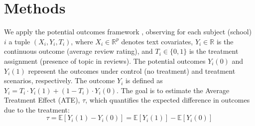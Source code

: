 \documentclass[11pt]{article}
\begin{document}
\section{Methods}
\label{sec:methods}
\label{subsec:estimation-treatment-effects}
We apply the potential outcomes framework \cite{neyman1923application}, observing for each subject (school) \(i\) a tuple \((X_i, Y_i, T_i)\), where \(X_i \in \mathbb{R}^p\) denotes text covariates, \(Y_i \in \mathbb{R}\) is the continuous outcome (average review rating), and \(T_i \in \{0, 1\}\) is the treatment assignment (presence of topic in reviews). The potential outcomes \(Y_i(0)\) and \(Y_i(1)\) represent the outcomes under control (no treatment) and treatment scenarios, respectively. The outcome \(Y_i\) is defined as \(Y_i = T_i \cdot Y_i(1) + (1 - T_i) \cdot Y_i(0)\). The goal is to estimate the Average Treatment Effect (ATE), \(\tau\), which quantifies the expected difference in outcomes due to the treatment:
\begin{equation}
\label{eq:ATE_def}
\tau = \mathbb{E}[Y_i(1) - Y_i(0)] = \mathbb{E}[Y_i(1)] - \mathbb{E}[Y_i(0)]
\end{equation}
\end{document}
